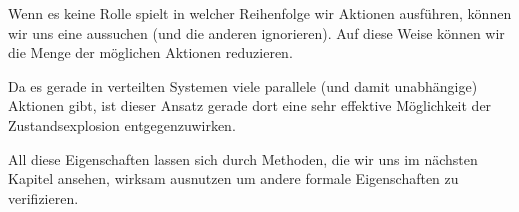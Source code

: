 Wenn es keine Rolle spielt in welcher Reihenfolge wir Aktionen ausführen, können wir uns eine aussuchen (und die anderen ignorieren).
Auf diese Weise können wir die Menge der möglichen Aktionen reduzieren.

Da es gerade in verteilten Systemen viele parallele (und damit unabhängige) Aktionen gibt, ist dieser Ansatz gerade dort eine sehr effektive Möglichkeit der Zustandsexplosion entgegenzuwirken.

All diese Eigenschaften lassen sich durch Methoden, die wir uns im nächsten Kapitel ansehen, wirksam ausnutzen um andere formale Eigenschaften zu verifizieren.